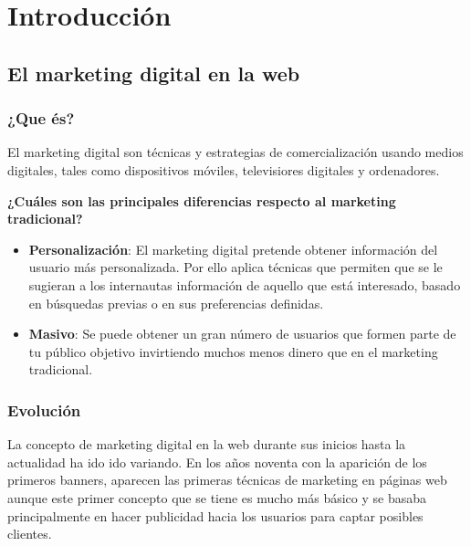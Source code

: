 \chapter{Introducción}


\section{El marketing digital en la web}


\subsection{¿Que és?}

El marketing digital son técnicas y estrategias de comercialización usando medios digitales, tales como dispositivos móviles, televisiores digitales y ordenadores.

\vspace{5 mm}

\textbf{¿Cuáles son las principales diferencias respecto al marketing tradicional?} 

\vspace{5 mm}

\begin{itemize}

\item \textbf{Personalización}: El marketing digital pretende obtener información del usuario más personalizada. Por ello aplica técnicas que permiten que se le sugieran a los internautas información de aquello que está interesado, basado en búsquedas previas o en sus preferencias definidas.

\item \textbf{Masivo}: Se puede obtener un gran número de usuarios que formen parte de tu público objetivo invirtiendo muchos menos dinero que en el marketing tradicional.


\end{itemize}

\subsection{Evolución}

La concepto de marketing digital en la web durante sus inicios hasta la actualidad ha ido ido variando. En los años noventa con la aparición de los primeros banners, aparecen las primeras técnicas de marketing en páginas web aunque este primer concepto que se tiene es mucho más básico y se basaba principalmente en hacer publicidad hacia los usuarios para captar posibles clientes.

